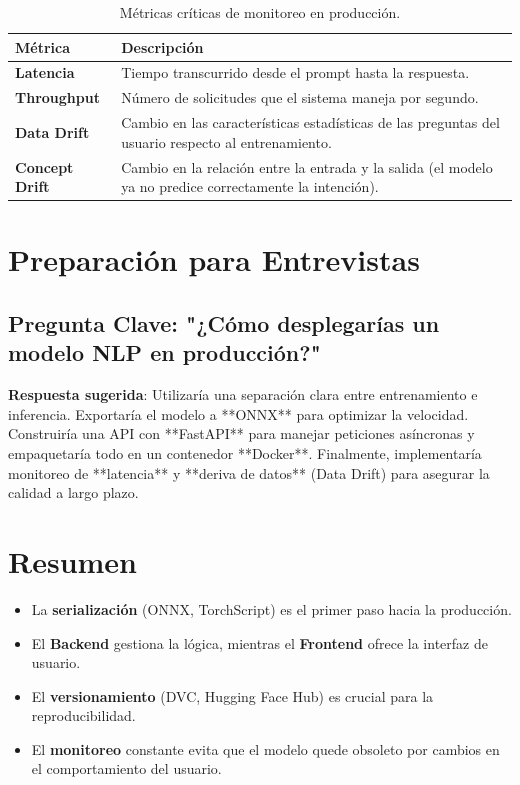 \documentclass[12pt,a4paper,openany,oneside]{book}
\begin{document}
\begin{table}[h]
\centering
\begin{tabular}{|l|p{8cm}|}
\hline
\rowcolor{gray!20} \textbf{Métrica} & \textbf{Descripción} \\ \hline
\textbf{Latencia} & Tiempo transcurrido desde el prompt hasta la respuesta. \\ \hline
\textbf{Throughput} & Número de solicitudes que el sistema maneja por segundo. \\ \hline
\textbf{Data Drift} & Cambio en las características estadísticas de las preguntas del usuario respecto al entrenamiento. \\ \hline
\textbf{Concept Drift} & Cambio en la relación entre la entrada y la salida (el modelo ya no predice correctamente la intención). \\ \hline
\end{tabular}
\caption{Métricas críticas de monitoreo en producción.}
\end{table}

\section{Preparación para Entrevistas}

\subsection{Pregunta Clave: "¿Cómo desplegarías un modelo NLP en producción?"}
\textbf{Respuesta sugerida}: Utilizaría una separación clara entre entrenamiento e inferencia. Exportaría el modelo a **ONNX** para optimizar la velocidad. Construiría una API con **FastAPI** para manejar peticiones asíncronas y empaquetaría todo en un contenedor **Docker**. Finalmente, implementaría monitoreo de **latencia** y **deriva de datos** (Data Drift) para asegurar la calidad a largo plazo.

\section{Resumen}
\begin{itemize}
    \item La \textbf{serialización} (ONNX, TorchScript) es el primer paso hacia la producción.
    \item El \textbf{Backend} gestiona la lógica, mientras el \textbf{Frontend} ofrece la interfaz de usuario.
    \item El \textbf{versionamiento} (DVC, Hugging Face Hub) es crucial para la reproducibilidad.
    \item El \textbf{monitoreo} constante evita que el modelo quede obsoleto por cambios en el comportamiento del usuario.
\end{itemize}
\end{document}
